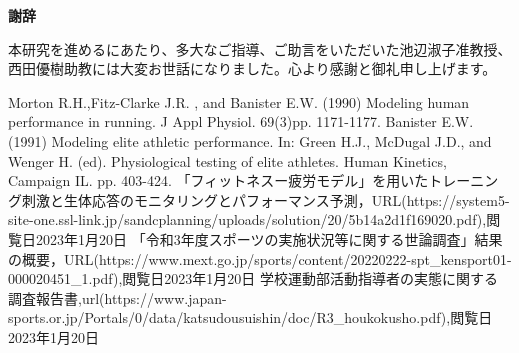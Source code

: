 \documentclass[12pt,fleqn]{jreport}
\begin{document}
\newpage
\begin{flushleft}
  {\Huge\textbf{謝辞}}
\end{flushleft}
\vspace{2cm}
本研究を進めるにあたり、多大なご指導、ご助言をいただいた池辺淑子准教授、西田優樹助教には大変お世話になりました。心より感謝と御礼申し上げます。
\newpage
\begin{thebibliography}{99}
  Morton R.H.,Fitz-Clarke J.R. , and Banister E.W. (1990) Modeling human performance in running. J Appl Physiol. 69(3)pp. 1171-1177.
  Banister E.W. (1991) Modeling elite athletic performance. In: Green H.J., McDugal J.D., and Wenger H. (ed). Physiological testing of elite athletes. Human Kinetics, Campaign IL. pp. 403-424.
  「フィットネスー疲労モデル」を用いたトレーニング刺激と生体応答のモニタリングとパフォーマンス予測，URL(https://system5-site-one.ssl-link.jp/sandcplanning/uploads/solution/20/5b14a2d1f169020.pdf),閲覧日2023年1月20日
  「令和3年度スポーツの実施状況等に関する世論調査」結果の概要，URL(https://www.mext.go.jp/sports/content/20220222-spt\_kensport01-000020451\_1.pdf),閲覧日2023年1月20日
  学校運動部活動指導者の実態に関する調査報告書,url(https://www.japan-sports.or.jp/Portals/0/data/katsudousuishin/doc/R3\_houkokusho.pdf),閲覧日2023年1月20日
\end{thebibliography}
\end{document}
